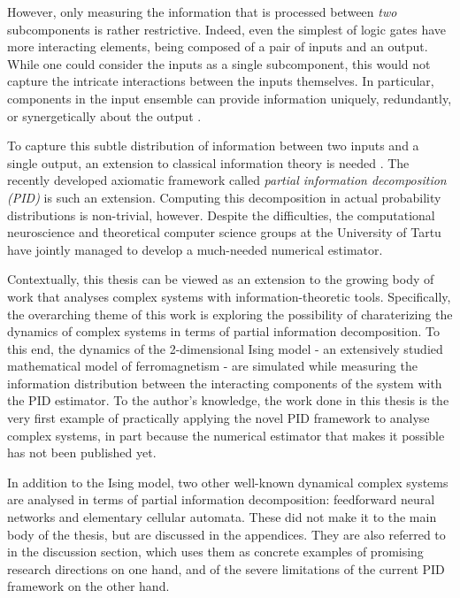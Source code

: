 \documentclass[12pt]{article}
\begin{document}
However, only measuring the information that is processed between \textit{two} subcomponents is rather restrictive. Indeed, even the simplest of logic gates have more interacting elements, being composed of a pair of inputs and an output. While one could consider the inputs as a single subcomponent, this would not capture the intricate interactions between the inputs themselves. In particular, components in the input ensemble can provide information uniquely, redundantly, or synergetically about the output \cite{williams-beer}.  

To capture this subtle distribution of information between two inputs and a single output, an extension to classical information theory is needed \cite{williams-beer}. The recently developed axiomatic framework called \textit{partial information decomposition (PID)} \cite{bertschinger} is such an extension. Computing this decomposition in actual probability distributions is non-trivial, however. Despite the difficulties, the computational neuroscience and theoretical computer science groups at the University of Tartu have jointly managed to develop a much-needed numerical estimator. 

Contextually, this thesis can be viewed as an extension to the growing body of work that analyses complex systems with information-theoretic tools. Specifically, the overarching theme of this work is exploring the possibility of charaterizing the dynamics of complex systems in terms of partial information decomposition. To this end, the dynamics of the 2-dimensional Ising model - an extensively studied mathematical model of ferromagnetism - are simulated while measuring the information distribution between the interacting components of the system with the PID estimator. To the author's knowledge, the work done in this thesis is the very first example of practically applying the novel PID framework to analyse complex systems, in part because the numerical estimator that makes it possible has not been published yet.

In addition to the Ising model, two other well-known dynamical complex systems are analysed in terms of partial information decomposition: feedforward neural networks and elementary cellular automata. These did not make it to the main body of the thesis, but are discussed in the appendices. They are also referred to in the discussion section, which uses them as concrete examples of promising research directions on one hand, and of the severe limitations of the current PID framework on the other hand. 
\end{document}
